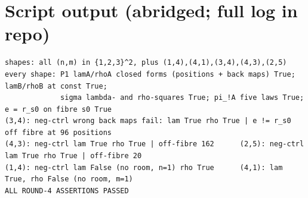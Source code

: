 \documentclass[10pt]{article}
\begin{document}
\section*{Script output (abridged; full log in repo)}
{\footnotesize\begin{verbatim}
shapes: all (n,m) in {1,2,3}^2, plus (1,4),(4,1),(3,4),(4,3),(2,5)
every shape: P1 lamA/rhoA closed forms (positions + back maps) True; lamB/rhoB at const True;
             sigma lambda- and rho-squares True; pi_!A five laws True; e = r_s0 on fibre s0 True
(3,4): neg-ctrl wrong back maps fail: lam True rho True | e != r_s0 off fibre at 96 positions
(4,3): neg-ctrl lam True rho True | off-fibre 162      (2,5): neg-ctrl lam True rho True | off-fibre 20
(1,4): neg-ctrl lam False (no room, n=1) rho True      (4,1): lam True, rho False (no room, m=1)
ALL ROUND-4 ASSERTIONS PASSED
\end{verbatim}}
\end{document}
